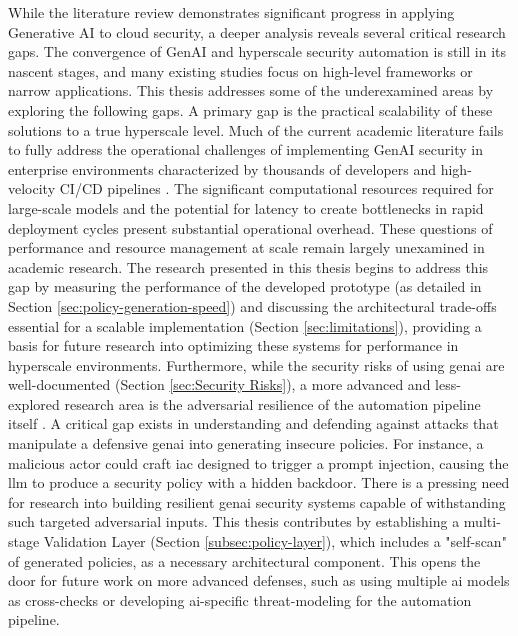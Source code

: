 While the literature review demonstrates significant progress in applying Generative AI to cloud security, a deeper analysis reveals several critical research gaps. The convergence of GenAI and \gls{hyperscale} security automation is still in its nascent stages, and many existing studies focus on high-level frameworks or narrow applications. This thesis addresses some of the underexamined areas by exploring the following gaps.
A primary gap is the practical scalability of these solutions to a true \gls{hyperscale} level. Much of the current academic literature fails to fully address the operational challenges of implementing GenAI security in enterprise environments characterized by thousands of developers and high-velocity CI/CD pipelines \cite{fu_ai_2025}. The significant computational resources required for large-scale models and the potential for latency to create bottlenecks in rapid deployment cycles present substantial operational overhead. These questions of performance and resource management at scale remain largely unexamined in academic research. The research presented in this thesis begins to address this gap by measuring the performance of the developed prototype (as detailed in Section \ref{sec:policy-generation-speed}) and discussing the architectural trade-offs essential for a scalable implementation (Section \ref{sec:limitations}), providing a basis for future research into optimizing these systems for performance in \gls{hyperscale} environments.
Furthermore, while the security risks of using \gls{genai} are well-documented (Section \ref{sec:Security Risks}), a more advanced and less-explored research area is the adversarial resilience of the automation pipeline itself \cite{nyoto_cyber_2024,dash_zero-trust_2024}. A critical gap exists in understanding and defending against attacks that manipulate a defensive \gls{genai} into generating insecure policies. For instance, a malicious actor could craft \gls{iac} designed to trigger a prompt injection, causing the \gls{llm} to produce a security policy with a hidden backdoor. There is a pressing need for research into building resilient \gls{genai} security systems capable of withstanding such targeted adversarial inputs. This thesis contributes by establishing a multi-stage Validation Layer (Section \ref{subsec:policy-layer}), which includes a "self-scan" of generated policies, as a necessary architectural component. This opens the door for future work on more advanced defenses, such as using multiple \gls{ai} models as cross-checks or developing \gls{ai}-specific \gls{threat-modeling} for the automation pipeline.
